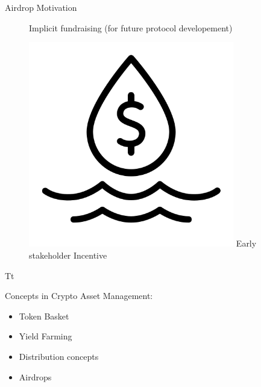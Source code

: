 \documentclass[handout]{beamer}
\begin{document}
\begin{frame}{Airdrop Motivation}
\begin{figure}[H]
\begin{minipage}[t]{.2\textwidth}
	\vspace{0.8em}\vspace{0.8em}    
    Implicit fundraising (for future protocol developement)
  \end{minipage}
  \hfill
  \begin{minipage}[t]{.2\textwidth}\vspace{20pt}%
  	\center 
	\includegraphics[width=0.8\textwidth]{../assets/images/liquidity.png}
    \vspace{0.8em}\vspace{0.8em}
    Early stakeholder Incentive
  \end{minipage}  
\end{figure}



\end{frame}




\begin{frame}{Tt}

Concepts in Crypto Asset Management: \\ \vspace{1em}
	
	\begin{itemize}
		\item<1-> Token Basket 
		\item<2-> Yield Farming
		\item<3-> Distribution concepts
		\item<4-> Airdrops
	\end{itemize}

\end{frame}
\end{document}
